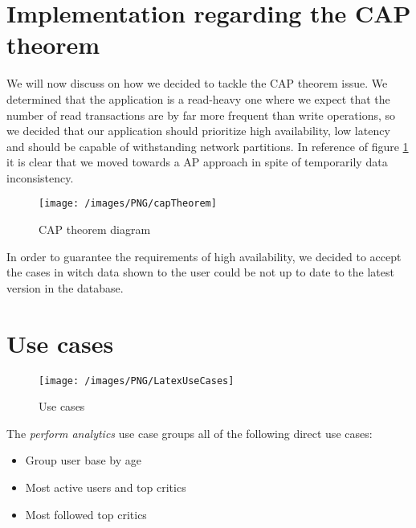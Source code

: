 \section{Implementation regarding the CAP theorem}
We will now discuss on how we decided to tackle the CAP theorem issue. We determined that the application is a read-heavy one where we expect that the number of read transactions are by far more frequent than write operations, so we decided that our application should prioritize high availability, low latency and should be capable of withstanding network partitions. In reference of figure \ref{fig:CAP} it is clear that we moved towards a AP approach in spite of temporarily data inconsistency.
\begin{figure}[H]
\begin{center}
\texttt{[image: /images/PNG/capTheorem]}
\caption{CAP theorem diagram}
\label{fig:CAP}
\end{center}
\end{figure}
In order to guarantee the requirements of high availability, we decided to accept the cases in witch data shown to the user could be not up to date to the latest version in the database.

\section{Use cases}
\begin{figure}[H]
\texttt{[image: /images/PNG/LatexUseCases]}
\caption{Use cases}
\label{fig:UseCases}
\end{figure}
The \emph{perform analytics} use case groups all of the following direct use cases:
\begin{itemize}
\item Group user base by age
\item Most active users and top critics
\item Most followed top critics
\end{itemize}

